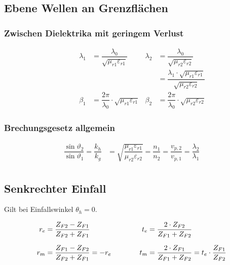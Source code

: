 \subsection{Ebene Wellen an Grenzflächen}
\subsubsection{Zwischen Dielektrika mit geringem Verlust}


\begin{align*}
	\quad \qquad \lambda_1 & = \dfrac{\lambda_0}{\sqrt{\mu_{r1}\varepsilon_{r1}}}          & \lambda_2 & = \dfrac{\lambda_0}{\sqrt{\mu_{r2}\varepsilon_{r2}}}                                     \\
	\quad \qquad           &                                                               &           & = \dfrac{\lambda_1\cdot\sqrt{\mu_{r1}\varepsilon_{r1}}}{\sqrt{\mu_{r2}\varepsilon_{r2}}} \\
	\quad \qquad \beta_1   & = \dfrac{2\pi}{\lambda_0}\cdot\sqrt{\mu_{r1}\varepsilon_{r1}} & \beta_2   & = \dfrac{2\pi}{\lambda_0}\cdot\sqrt{\mu_{r2}\varepsilon_{r2}}
\end{align*}

\subsubsection{Brechungsgesetz allgemein}
\begin{align*}
	\dfrac{\sin \vartheta_{2}}{\sin \vartheta_{1}} = \dfrac{k_{h}}{k_{g}} & = \sqrt{\dfrac{\mu_{r 1} \varepsilon_{r 1}}{\mu_{r 2} \varepsilon_{r 2}}} = \dfrac{n_{1}}{n_{2}} = \dfrac{v_{p, 2}}{v_{p, 1}} = \dfrac{\lambda_{2}}{\lambda_{1}} \\
\end{align*}

\subsection[Senkrechter Einfall]{Senkrechter Einfall}
Gilt bei Einfallswinkel $ \theta_h = 0 $.


\begin{equation*}
	\setlength{\jot}{10pt}
	\begin{aligned}[t]
		r_e & = \frac{Z_{F2}-Z_{F1}}{Z_{F2} + Z_{F1}} \\
		r_m & = \frac{Z_{F1}-Z_{F2}}{Z_{F2} + Z_{F1}}
		=-r_e                                         \\
	\end{aligned}
	\qquad \qquad
	\begin{aligned}[t]
		t_e & = \frac{2 \cdot Z_{F2}}{Z_{F1} + Z_{F2}} \\
		t_m & = \frac{2 \cdot Z_{F1}}{Z_{F1} + Z_{F2}}
		= t_e \cdot \frac{Z_{F1}}{Z_{F2}}              \\
	\end{aligned}
\end{equation*}

